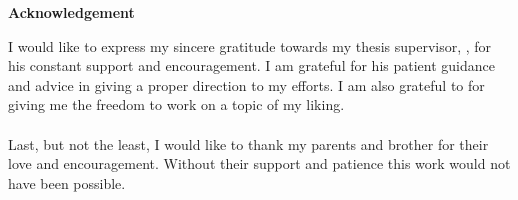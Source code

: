 \begin{center}
	{\huge{\textbf{Acknowledgement}}}
\end{center}
I would like to express my sincere gratitude towards my thesis supervisor, {\advisormain}, for his constant support and encouragement. I am grateful for his patient guidance and advice in giving a proper direction to my efforts. I am also grateful to {\advisorsec} for giving me the freedom to work on a topic of my liking.

\paragraph*{}
Last, but not the least, I would like to thank my parents and brother for their love and encouragement. Without their support and patience this work would not have been possible. 

\vskip 4mm
\begin{flushright}
\textit{\textbf{\author}}
\end{flushright}




